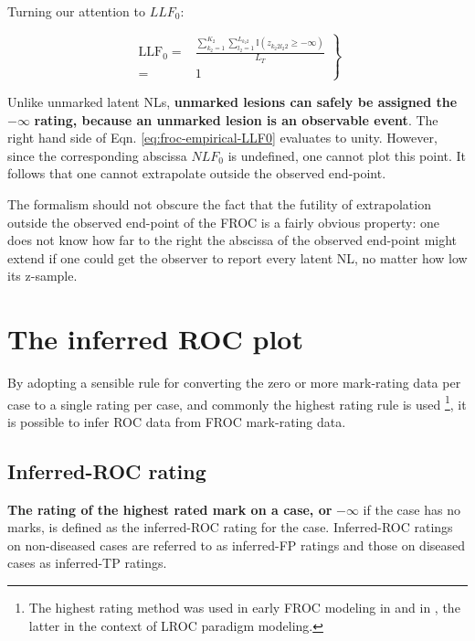 \documentclass[
]{book}
\begin{document}
Turning our attention to \(LLF_0\):

\begin{equation}
\left.
\begin{aligned}
\text{LLF}_0 =& \frac{ \sum_{k_2=1}^{K_2} \sum_{l_2=1}^{L_{k_2 2}} \mathbb{I} \left ( z_{k_2 2 l_2 2} \geq  -\infty  \right ) }{L_T}\\
=& 1
\end{aligned}
\right \}
\label{eq:froc-empirical-LLF0}
\end{equation}

Unlike unmarked latent NLs, \textbf{unmarked lesions can safely be assigned the} \(-\infty\) \textbf{rating, because an unmarked lesion is an observable event}. The right hand side of Eqn. \eqref{eq:froc-empirical-LLF0} evaluates to unity. However, since the corresponding abscissa \(NLF_0\) is undefined, one cannot plot this point. It follows that one cannot extrapolate outside the observed end-point.

The formalism should not obscure the fact that the futility of extrapolation outside the observed end-point of the FROC is a fairly obvious property: one does not know how far to the right the abscissa of the observed end-point might extend if one could get the observer to report every latent NL, no matter how low its z-sample.

\hypertarget{froc-empirical-ROC}{%
\section{The inferred ROC plot}\label{froc-empirical-ROC}}

By adopting a sensible rule for converting the zero or more mark-rating data per case to a single rating per case, and commonly the highest rating rule is used \footnote{The highest rating method was used in early FROC modeling in \citep{bunch1977free} and in \citep{swensson1996unified}, the latter in the context of LROC paradigm modeling.}, it is possible to infer ROC data from FROC mark-rating data.

\hypertarget{inferred-roc-rating}{%
\subsection{Inferred-ROC rating}\label{inferred-roc-rating}}

\textbf{The rating of the highest rated mark on a case, or} \(-\infty\) if the case has no marks, is defined as the inferred-ROC rating for the case. Inferred-ROC ratings on non-diseased cases are referred to as inferred-FP ratings and those on diseased cases as inferred-TP ratings.
\end{document}

